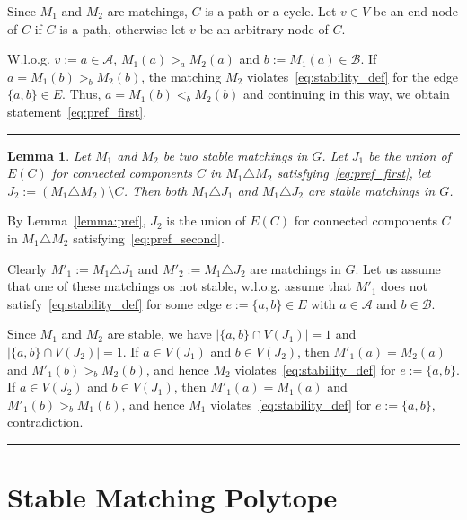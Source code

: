 \documentclass[preprint]{elsarticle}
\newtheorem{lemma}[fact]{Lemma}
\newenvironment{proof}{{\bf Proof:  }}{\hfill\rule{2mm}{2mm}}
\begin{document}
\begin{proof}
Since $M_1$ and $M_2$ are matchings, $C$ is a path or a cycle. Let $v\in V$ be an end node of $C$ if $C$ is a path, otherwise let $v$ be an arbitrary node of $C$. 

W.l.o.g. $v:=a\in \mathcal{A}$, $M_1(a) >_a M_2(a)$ and $b:=M_1(a)\in\mathcal{B}$. If $a=M_1(b) >_b M_2(b)$, the matching $M_2$ violates~\eqref{eq:stability_def} for the edge $\{a,b\}\in E$. Thus, $a=M_1(b) <_b M_2(b)$ and continuing in this way, we obtain statement~\eqref{eq:pref_first}.

\end{proof}


\begin{lemma}\label{lemma:sym_stable} 
Let $M_1$ and $M_2$ be two stable matchings in $G$. Let $J_1$ be the union of $E(C)$ for connected components $C$ in $M_1 \triangle M_2$ satisfying~\eqref{eq:pref_first}, let $J_2:=(M_1\triangle M_2)\setminus C$. Then both $M_1\triangle J_1$ and $M_1\triangle J_2$ are stable matchings in $G$.
\end{lemma}
\begin{proof}
By Lemma~\ref{lemma:pref}, $J_2$ is the union of $E(C)$ for connected components $C$ in $M_1 \triangle M_2$ satisfying~\eqref{eq:pref_second}.

Clearly $M'_1:=M_1\triangle J_1$ and $M'_2:=M_1\triangle J_2$ are matchings in $G$. Let us assume that one of these matchings os not stable, w.l.o.g. assume that $M'_1$ does not satisfy~\eqref{eq:stability_def} for some edge $e:=\{a,b\}\in E$ with $a\in\mathcal{A}$ and $b\in\mathcal{B}$. 

Since $M_1$ and $M_2$ are stable, we have $|\{a,b\}\cap V(J_1)|=1$ and $|\{a,b\}\cap V(J_2)|=1$.
If $a\in V(J_1)$ and $b\in V(J_2)$, then $M'_1(a)=M_2(a)$ and $M'_1(b)>_b M_2(b)$, and hence $M_2$ violates~\eqref{eq:stability_def} for $e:=\{a,b\}$. If $a\in V(J_2)$ and $b\in V(J_1)$, then $M'_1(a)=M_1(a)$ and $M'_1(b)>_b M_1(b)$, and hence $M_1$ violates~\eqref{eq:stability_def} for $e:=\{a,b\}$, contradiction.
\end{proof}

\section{Stable Matching Polytope}
\end{document}
